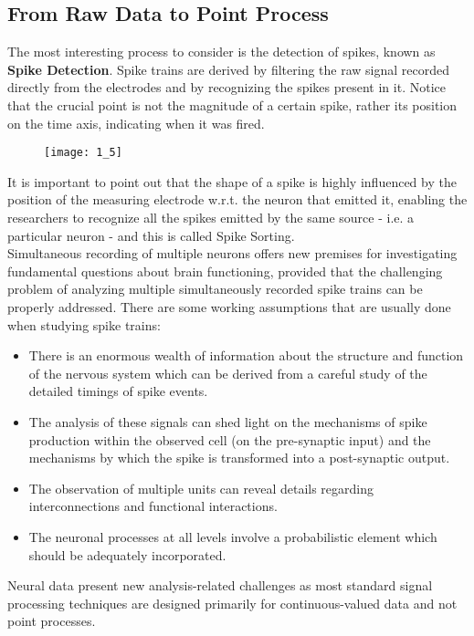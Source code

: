 \subsection{From Raw Data to Point Process}
The most interesting process to consider is the detection of
spikes, known as \textbf{Spike Detection}.
Spike trains are derived by filtering the raw signal recorded directly from the
electrodes and by recognizing the spikes present in it. Notice that the
crucial point is not the magnitude of a certain spike, rather its position
on the time axis, indicating when it was fired.
\begin{figure}[H]
      \texttt{[image: 1\_5]}
      \centering
\end{figure}
It is important to point out that the shape of a spike is highly
influenced by the position of the measuring electrode w.r.t. the neuron
that emitted it, enabling the researchers to recognize all the spikes
emitted by the same source - i.e. a
particular neuron - and this is called Spike Sorting.\\
Simultaneous recording of multiple neurons offers new premises for
investigating fundamental questions about brain functioning, provided that
the challenging problem of analyzing multiple simultaneously recorded
spike trains can be properly addressed.
There are some working assumptions that are usually done when studying
spike trains:
\begin{itemize}
      \item There is an enormous wealth of information about the structure
            and function of the nervous system which can be derived from a careful study
            of the detailed timings of spike events.
      \item The analysis of these signals can shed light on the mechanisms of
            spike production within the observed cell (on the pre-synaptic input) and
            the mechanisms by which the spike is transformed into a post-synaptic
            output.
      \item The observation of multiple units can reveal details regarding
            interconnections and functional interactions.
      \item The neuronal processes at all levels involve a probabilistic element
            which should be adequately incorporated.
\end{itemize}
Neural data present new analysis-related challenges as most standard signal
processing techniques are designed primarily for continuous-valued data
and not point processes.
